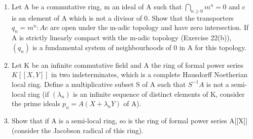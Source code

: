 \begin{enumerate}
\def\labelenumi{\arabic{enumi}.}
\setcounter{enumi}{28}
\item
  Let A be a commutative ring, m an ideal of A such that \(\bigcap_{n\geq0}m^{n}=0\) and c is an element of A which is not a divisor of 0. Show that the transporters \(q_{n}=m^{n}:Ac\) are open under the m-adic topology and have zero intersection. If A is strictly linearly compact with the m-adic topology (Exercise 22(b)), \((q_{n})\) is a fundamental system of neighbourhoods of 0 in A for this topology.
\item
  Let K be an infinite commutative field and A the ring of formal power series \(K[[X,Y]]\) in two indeterminates, which is a complete Hausdorff Noetherian local ring. Define a multiplicative subset S of A such that \(S^{-1}A\) is not a semi-local ring (if \((\lambda_{n})\) is an infinite sequence of distinct elements of K, consider the prime ideals \(p_{n}=A(X+\lambda_{n}Y)\) of A).
\item
  Show that if A is a semi-local ring, so is the ring of formal power series A{[}{[}X{]}{]} (consider the Jacobson radical of this ring).
\end{enumerate}

